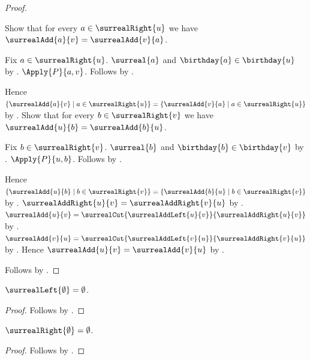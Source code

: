 \begin{proof}
\begin{subproof}
        Show that for every $a\in\surrealRight{u}$ we have
            $\surrealAdd{a}{v}=\surrealAdd{v}{a}$.
        \begin{subproof}
            Fix $a\in\surrealRight{u}$.
            $\surreal{a}$ and $\birthday{a}\in\birthday{u}$
                by .
            $\Apply{P}{a,v}$.
            Follows by \auto.
        \end{subproof}
        Hence $\{\surrealAdd{a}{v}\mid a\in\surrealRight{u}\}
            =\{\surrealAdd{v}{a}\mid a\in\surrealRight{u}\}$
            by .
        Show that for every $b\in\surrealRight{v}$ we have
            $\surrealAdd{u}{b}=\surrealAdd{b}{u}$.
        \begin{subproof}
            Fix $b\in\surrealRight{v}$.
            $\surreal{b}$ and $\birthday{b}\in\birthday{v}$
                by .
            $\Apply{P}{u,b}$.
            Follows by \auto.
        \end{subproof}
        Hence $\{\surrealAdd{u}{b}\mid b\in\surrealRight{v}\}
            =\{\surrealAdd{b}{u}\mid b\in\surrealRight{v}\}$
            by .
        $\surrealAddRight{u}{v}=\surrealAddRight{v}{u}$
            by .
        $\surrealAdd{u}{v}=
            \surrealCut{\surrealAddLeft{u}{v}}{\surrealAddRight{u}{v}}$
            by .
        $\surrealAdd{v}{u}=
            \surrealCut{\surrealAddLeft{v}{u}}{\surrealAddRight{v}{u}}$
            by .
        Hence $\surrealAdd{u}{v}=\surrealAdd{v}{u}$ by \auto.
    \end{subproof}
    Follows by .
\end{proof}

\begin{proposition}\label{empty_surreal_left}
    $\surrealLeft{\emptyset}=\emptyset$.
\end{proposition}
\begin{proof}
    Follows by
        .
\end{proof}

\begin{proposition}\label{empty_surreal_right}
    $\surrealRight{\emptyset}=\emptyset$.
\end{proposition}
\begin{proof}
    Follows by
        .
\end{proof}

